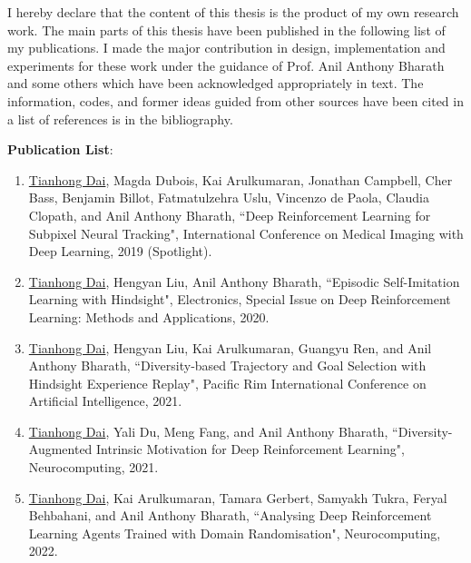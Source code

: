 
\cleardoublepage

\begin{dedication}
  I hereby declare that the content of this thesis is the product of my own research work. The main parts of this thesis have been published in the following list of my publications. I made the major contribution in design, implementation and experiments for these work under the guidance of Prof. Anil Anthony Bharath and some others which have been acknowledged appropriately in text. The information, codes, and former ideas guided from other sources have been cited in a list of references is in the bibliography.
\end{dedication}
\textbf{Publication List}:
\begin{enumerate}
	\item \underline{Tianhong Dai}, Magda Dubois, Kai Arulkumaran, Jonathan Campbell, Cher Bass, Benjamin Billot, Fatmatulzehra Uslu, Vincenzo de Paola, Claudia Clopath, and Anil Anthony Bharath, ``Deep Reinforcement Learning for Subpixel Neural Tracking", International Conference on Medical Imaging with Deep Learning, 2019 (Spotlight).
	\item \underline{Tianhong Dai}, Hengyan Liu, Anil Anthony Bharath, ``Episodic Self-Imitation Learning with Hindsight", Electronics, Special Issue on Deep Reinforcement Learning: Methods and Applications, 2020.
	\item \underline{Tianhong Dai}, Hengyan Liu, Kai Arulkumaran, Guangyu Ren, and Anil Anthony Bharath, ``Diversity‐based Trajectory and Goal Selection with Hindsight Experience Replay", Pacific Rim International Conference on Artificial Intelligence, 2021.
	\item \underline{Tianhong Dai}, Yali Du, Meng Fang, and Anil Anthony Bharath, ``Diversity-Augmented Intrinsic Motivation for Deep Reinforcement Learning", Neurocomputing, 2021.
	\item \underline{Tianhong Dai}, Kai Arulkumaran, Tamara Gerbert, Samyakh Tukra, Feryal Behbahani, and Anil Anthony Bharath, ``Analysing Deep Reinforcement Learning Agents Trained with Domain Randomisation", Neurocomputing, 2022.
\end{enumerate}

